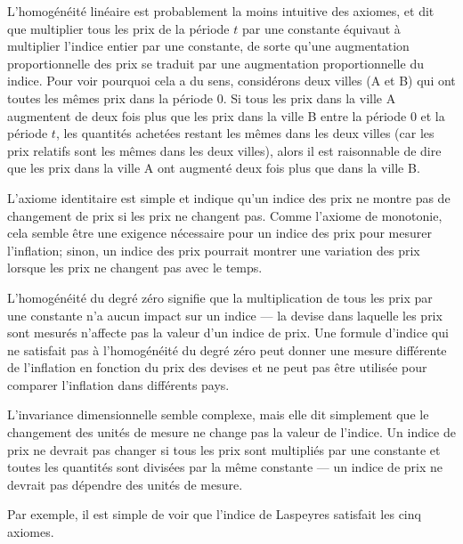 \documentclass[]{article}
\begin{document}
L'homogénéité linéaire est probablement la moins intuitive des axiomes, et dit que multiplier tous les prix de la période \(t\) par une constante équivaut à multiplier l'indice entier par une constante, de sorte qu'une augmentation proportionnelle des prix se traduit par une augmentation proportionnelle du indice. Pour voir pourquoi cela a du sens, considérons deux villes (A et B) qui ont toutes les mêmes prix dans la période 0. Si tous les prix dans la ville A augmentent de deux fois plus que les prix dans la ville B entre la période 0 et la période \(t\), les quantités achetées restant les mêmes dans les deux villes (car les prix relatifs sont les mêmes dans les deux villes), alors il est raisonnable de dire que les prix dans la ville A ont augmenté deux fois plus que dans la ville B.

L'axiome identitaire est simple et indique qu'un indice des prix ne montre pas de changement de prix si les prix ne changent pas. Comme l'axiome de monotonie, cela semble être une exigence nécessaire pour un indice des prix pour mesurer l'inflation; sinon, un indice des prix pourrait montrer une variation des prix lorsque les prix ne changent pas avec le temps.

L'homogénéité du degré zéro signifie que la multiplication de tous les prix par une constante n'a aucun impact sur un indice --- la devise dans laquelle les prix sont mesurés n'affecte pas la valeur d'un indice de prix. Une formule d'indice qui ne satisfait pas à l'homogénéité du degré zéro peut donner une mesure différente de l'inflation en fonction du prix des devises et ne peut pas être utilisée pour comparer l'inflation dans différents pays.

L'invariance dimensionnelle semble complexe, mais elle dit simplement que le changement des unités de mesure ne change pas la valeur de l'indice. Un indice de prix ne devrait pas changer si tous les prix sont multipliés par une constante et toutes les quantités sont divisées par la même constante --- un indice de prix ne devrait pas dépendre des unités de mesure.

Par exemple, il est simple de voir que l'indice de Laspeyres satisfait les cinq axiomes.
\end{document}
